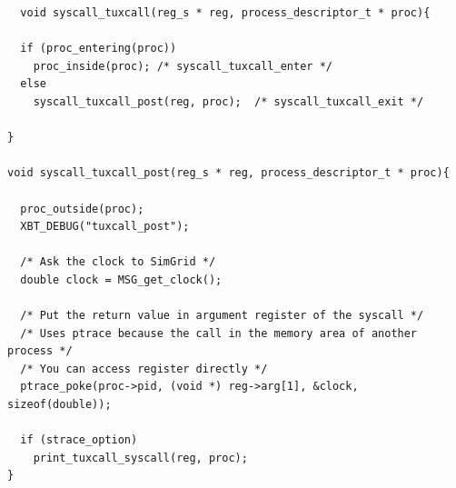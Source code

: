 \begin{lstlisting}
  void syscall_tuxcall(reg_s * reg, process_descriptor_t * proc){

  if (proc_entering(proc))
    proc_inside(proc); /* syscall_tuxcall_enter */
  else
    syscall_tuxcall_post(reg, proc);  /* syscall_tuxcall_exit */
  
}

void syscall_tuxcall_post(reg_s * reg, process_descriptor_t * proc){

  proc_outside(proc);
  XBT_DEBUG("tuxcall_post");

  /* Ask the clock to SimGrid */
  double clock = MSG_get_clock();
  
  /* Put the return value in argument register of the syscall */
  /* Uses ptrace because the call in the memory area of another process */
  /* You can access register directly */
  ptrace_poke(proc->pid, (void *) reg->arg[1], &clock, sizeof(double)); 

  if (strace_option)
    print_tuxcall_syscall(reg, proc);
}
\end{lstlisting}

